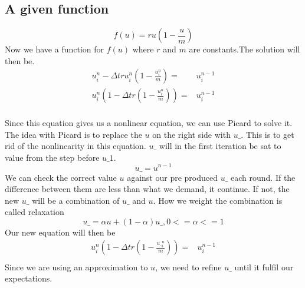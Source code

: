 \documentclass[norsk,11pt,a4paper]{article}
\begin{document}
\subsection*{A given function}
\begin{equation}
f(u) = ru(1-\frac{u}{m})
\end{equation}
Now we have a function for $f(u)$ where $r$ and $m$ are constants.The solution
will then be.
\begin{align*}
u^n_i-\Delta t ru^n_i(1-\frac{u^n_i}{m}) =& u^{n-1}_i\\
u^n_i(1-\Delta t r(1-\frac{u^n_i}{m})) =& u^{n-1}_i
\end{align*}
\\
Since this equation gives us a nonlinear equation, we can use Picard to solve
it. The idea with Picard is to replace the $u$ on the right side with $u\_$. This is to get rid of the nonlinearity in this equation. $u\_$ will in the first
iteration be sat to value from the step before $u\_1$. 
\begin{equation*}
	u\_ = u^{n-1}
\end{equation*}
We can check the correct value $u$ against our pre produced $u\_$ each round. If the difference between
them are less than what we demand, it continue. If not, the new $u\_$ will be a combination of $u\_$ and $u$. How we weight the combination is called relaxation 
\begin{equation*}
u\_ = \alpha u + (1-\alpha)u\_, 0<= \alpha <=1
\end{equation*}
Our new equation will then be
\begin{align*}
	u^n_i(1- \Delta t r(1-\frac{u\__i^n}{m}))=& u^{n-1}_i\\
\end{align*}
Since we are using an approximation to $u$, we need to refine $u\_$ until it
fulfil our expectations.
\end{document}
